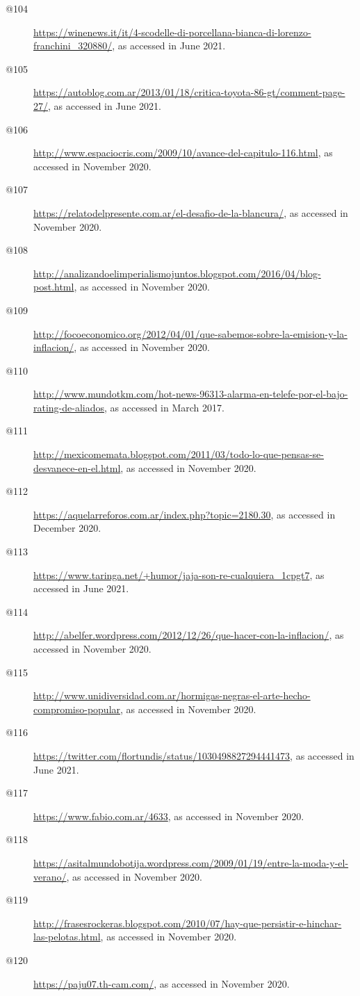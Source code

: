 \begin{flushleft}
\begin{description}
\item[{{@104}}] { \url{https://winenews.it/it/4-scodelle-di-porcellana-bianca-di-lorenzo-franchini_320880/}{, as accessed in June 2021.}}
\item[{{@105}}] { \url{https://autoblog.com.ar/2013/01/18/critica-toyota-86-gt/comment-page-27/}{, as accessed in June 2021.}}
\item[@106] \url{http://www.espaciocris.com/2009/10/avance-del-capitulo-116.html}, as accessed in November 2020.
\item[@107] \url{https://relatodelpresente.com.ar/el-desafio-de-la-blancura/}, as accessed in November 2020.
\item[@108] \url{http://analizandoelimperialismojuntos.blogspot.com/2016/04/blog-post.html}, as accessed in November 2020.
\item[@109] \url{http://focoeconomico.org/2012/04/01/que-sabemos-sobre-la-emision-y-la-inflacion/}, as accessed in November 2020.
\item[@110] \url{http://www.mundotkm.com/hot-news-96313-alarma-en-telefe-por-el-bajo-rating-de-aliados}, as accessed in March 2017.
\item[@111] \url{http://mexicomemata.blogspot.com/2011/03/todo-lo-que-pensas-se-desvanece-en-el.html}, as accessed in November 2020.
\item[@112] \url{https://aquelarreforos.com.ar/index.php?topic=2180.30}, as accessed in December 2020.
\item[@113] \url{https://www.taringa.net/+humor/jaja-son-re-cualquiera_1cpgt7}, as accessed in June 2021.
\item[@114] \url{http://abelfer.wordpress.com/2012/12/26/que-hacer-con-la-inflacion/}, as accessed in November 2020.
\item[@115] \url{http://www.unidiversidad.com.ar/hormigas-negras-el-arte-hecho-compromiso-popular}, as accessed in November 2020.
\item[@116] \url{https://twitter.com/flortundis/status/1030498827294441473}, as accessed in June 2021.
\item[@117] \url{https://www.fabio.com.ar/4633}, as accessed in November 2020.
\item[@118] \url{https://asitalmundobotija.wordpress.com/2009/01/19/entre-la-moda-y-el-verano/}, as accessed in November 2020.
\item[@119] \url{http://frasesrockeras.blogspot.com/2010/07/hay-que-persistir-e-hinchar-las-pelotas.html}, as accessed in November 2020.
\item[@120] \url{https://paju07.th-cam.com/}, as accessed in November 2020.

\end{description}
\end{flushleft}
